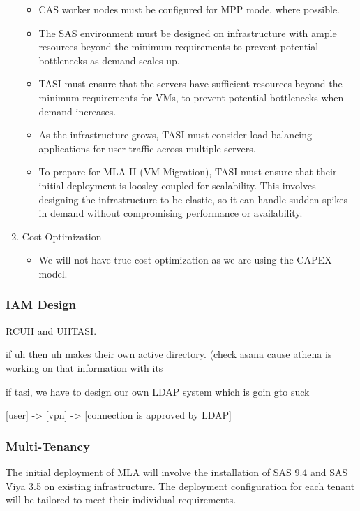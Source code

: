 \begin{enumerate}
    \begin{itemize}
        \item CAS worker nodes must be configured for MPP mode, where possible. 
        \item The SAS environment must be designed on infrastructure with ample resources beyond the minimum requirements to prevent potential bottlenecks as demand scales up.
        \item TASI must ensure that the servers have sufficient resources beyond the minimum requirements for VMs, to prevent potential bottlenecks when demand increases. 
        \item As the infrastructure grows, TASI must consider load balancing applications for user traffic across multiple servers. 
        \item To prepare for MLA II (VM Migration), TASI must ensure that their initial deployment is loosley coupled for scalability. This involves designing the infrastructure to be elastic, so it can handle sudden spikes in demand without compromising performance or availability.
    \end{itemize}
    \item Cost Optimization
    \begin{itemize}
        \item We will not have true cost optimization as we are using the CAPEX model. 
    \end{itemize}
\end{enumerate}

\subsubsection{IAM Design}

RCUH and UHTASI.

if uh then uh makes their own active directory. (check asana cause athena is working on that information with its

if tasi, we have to design our own LDAP system which is goin gto suck 

[user] -> [vpn] -> [connection is approved by LDAP]

\subsubsection{Multi-Tenancy}

The initial deployment of MLA will involve the installation of SAS 9.4 and SAS Viya 3.5 on existing infrastructure. The deployment configuration for each tenant will be tailored to meet their individual requirements. 

